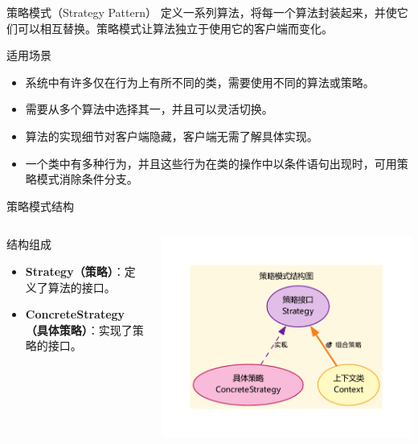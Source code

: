 \documentclass[UTF8,aspectratio=169]{beamer}
\begin{document}
\begin{frame}{策略模式（Strategy Pattern）}
    定义一系列算法，将每一个算法封装起来，并使它们可以相互替换。策略模式让算法独立于使用它的客户端而变化。

    \begin{ytublock}{适用场景}
        \begin{itemize}
            \item 系统中有许多仅在行为上有所不同的类，需要使用不同的算法或策略。
            \item 需要从多个算法中选择其一，并且可以灵活切换。
            \item 算法的实现细节对客户端隐藏，客户端无需了解具体实现。
            \item 一个类中有多种行为，并且这些行为在类的操作中以条件语句出现时，可用策略模式消除条件分支。
        \end{itemize}
    \end{ytublock}
\end{frame}

\begin{frame}{策略模式结构}
    \begin{columns}
        \begin{column}{0.48\textwidth}
            \begin{ytublock}{结构组成}
                \begin{itemize}
                    \item \textbf{Strategy（策略）}：定义了算法的接口。
                    \item \textbf{ConcreteStrategy（具体策略）}：实现了策略的接口。
                \end{itemize}
            \end{ytublock}
        \end{column}
        \begin{column}{0.48\textwidth}
            \begin{center}
                \includegraphics[width=1.0\textwidth]{images/strategy_pattern.pdf}
            \end{center}
        \end{column}
    \end{columns}
\end{frame}
\end{document}
